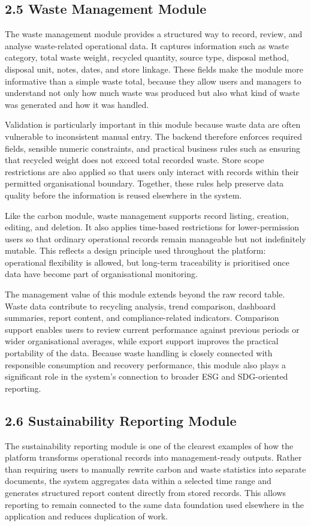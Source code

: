 \documentclass[10pt,a4paper]{article}
\begin{document}
\subsection*{2.5 Waste Management Module}
The waste management module provides a structured way to record, review, and analyse waste-related operational data. It captures information such as waste category, total waste weight, recycled quantity, source type, disposal method, disposal unit, notes, dates, and store linkage. These fields make the module more informative than a simple waste total, because they allow users and managers to understand not only how much waste was produced but also what kind of waste was generated and how it was handled.

Validation is particularly important in this module because waste data are often vulnerable to inconsistent manual entry. The backend therefore enforces required fields, sensible numeric constraints, and practical business rules such as ensuring that recycled weight does not exceed total recorded waste. Store scope restrictions are also applied so that users only interact with records within their permitted organisational boundary. Together, these rules help preserve data quality before the information is reused elsewhere in the system.

Like the carbon module, waste management supports record listing, creation, editing, and deletion. It also applies time-based restrictions for lower-permission users so that ordinary operational records remain manageable but not indefinitely mutable. This reflects a design principle used throughout the platform: operational flexibility is allowed, but long-term traceability is prioritised once data have become part of organisational monitoring.

The management value of this module extends beyond the raw record table. Waste data contribute to recycling analysis, trend comparison, dashboard summaries, report content, and compliance-related indicators. Comparison support enables users to review current performance against previous periods or wider organisational averages, while export support improves the practical portability of the data. Because waste handling is closely connected with responsible consumption and recovery performance, this module also plays a significant role in the system's connection to broader ESG and SDG-oriented reporting.

\subsection*{2.6 Sustainability Reporting Module}
The sustainability reporting module is one of the clearest examples of how the platform transforms operational records into management-ready outputs. Rather than requiring users to manually rewrite carbon and waste statistics into separate documents, the system aggregates data within a selected time range and generates structured report content directly from stored records. This allows reporting to remain connected to the same data foundation used elsewhere in the application and reduces duplication of work.
\end{document}

